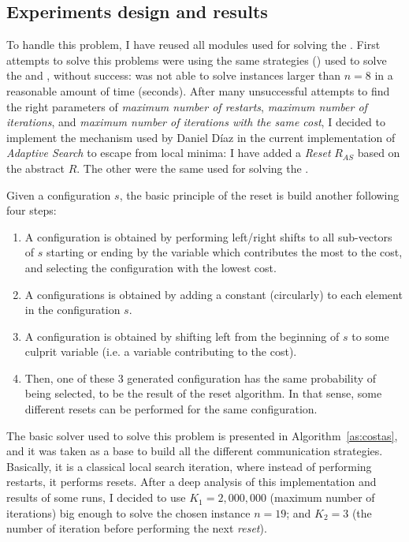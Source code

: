 
\subsection{Experiments design and results}

To handle this problem, I have reused all modules used for solving the \nqp. First attempts to solve this problems were using the same strategies (\ass) used to solve the \sgp{} and \nqp, without success: \posl{} was not able to solve instances larger than $n = 8$ in a reasonable amount of time (seconds). After many unsuccessful attempts to find the right parameters of \textit{maximum number of restarts}, \textit{maximum number of iterations}, and \textit{maximum number of iterations with the same cost}, I decided to implement the mechanism used by Daniel D\'iaz in the current implementation of {\it Adaptive Search} to escape from local minima: I have added a {\it Reset} \om{} $R_{AS}$ based on the abstract \om{} $R$. The other \oms{} were the same used for solving the \nqp.

Given a configuration $s$, the basic principle of the reset is build another following four steps:
\begin{enumerate}
\item A configuration is obtained by performing left/right shifts to all sub-vectors of $s$ starting or ending by the variable which contributes the most to the cost, and selecting the configuration with the lowest cost.
\item A configurations is obtained by adding a constant (circularly) to each element in the configuration $s$.
\item A configuration is obtained by shifting left from the beginning of $s$ to some culprit variable (i.e. a variable contributing to the cost).
\item Then, one of these 3 generated configuration has the same probability of being selected, to be the result of the reset algorithm. In that sense, some different resets can be performed for the same configuration.
\end{enumerate}


The basic solver used to solve this problem is presented in Algorithm~\ref{as:costas}, and it was taken as a base to build all the different communication strategies. Basically, it is a classical local search iteration, where instead of performing restarts, it performs resets. After a deep analysis of this implementation and results of some runs, I decided to use $K_1 = 2,000,000$ (maximum number of iterations) big enough to solve the chosen instance $n = 19$; and $K_2 = 3$ (the number of iteration before performing the next \textit{reset}).

